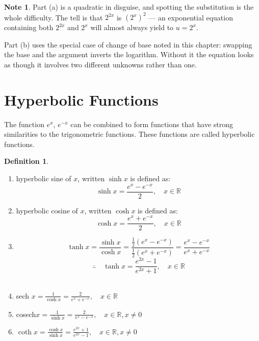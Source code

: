 \documentclass[11pt,a4paper]{article}
\theoremstyle{definition}
\newtheorem{definition}[thm]{Definition}
\newtheorem{note}[thm]{Note}
\begin{document}
\begin{note}
Part (a) is a quadratic in disguise, and spotting the substitution is the whole
difficulty. The tell is that $2^{2x}$ is $\left(2^{x}\right)^{2}$ --- an exponential
equation containing both $2^{2x}$ and $2^{x}$ will almost always yield to
$u=2^{x}$.

Part (b) uses the special case of change of base noted in this chapter: swapping
the base and the argument inverts the logarithm. Without it the equation looks as
though it involves two different unknowns rather than one.
\end{note}

\pagebreak
\section{Hyperbolic Functions}

The function $e^x$, $e^{-x}$ can be combined to form functions that have strong similarities to the trigonometric functions. These functions are called hyperbolic functions.\\

\begin{definition}

\begin{enumerate}
\item hyperbolic sine of $x$, written $\sinh x$ is defined as: $$\sinh x=\frac{e^{\displaystyle {x}}-e^{\displaystyle {-x}}}{2},\quad  x\in \mathbb{R}$$
\item hyperbolic cosine of $x$, written $\cosh x$ is defined as: $$\cosh x =\frac{e^{\displaystyle {x}}+e^{\displaystyle {-x}}}{2},\quad  x\in \mathbb{R}$$
\item $$\tanh x =\frac{\sinh x}{\cosh x}=\frac{\frac{1}{2}(e^{\displaystyle {x}}-e^{\displaystyle {-x}})}{\frac{1}{2}(e^{\displaystyle {x}}+e^{\displaystyle {-x}})}=\frac{e^{\displaystyle {x}}-e^{\displaystyle {-x}}}{e^{\displaystyle {x}}+e^{\displaystyle {-x}}}$$
$$\therefore \quad  \tanh x =\frac{e^{\displaystyle {2x}}-1}{e^{\displaystyle {2x}}+1}, \quad  x\in \mathbb{R}$$\\

\item sech $x=\frac{1}{\cosh x} =\frac{2}{\displaystyle{e^{\displaystyle{x}}+e^{\displaystyle{-x}}}},\quad  x\in \mathbb{R}$\\

\item cosech$x=\frac{1}{\sinh x}=\frac{2}{\displaystyle{e^{\displaystyle{x}}-e^{\displaystyle{-x}}}},\quad  x\in \mathbb{R}, x\neq 0$\\

\item $\coth x =\frac{\cosh x}{\sinh x}=\frac{\displaystyle{e^{\displaystyle{2x}}+1}}{\displaystyle{e^{\displaystyle{2x}}-1}},\quad  x\in \mathbb{R},x\neq 0$\\
\end{enumerate}
\end{definition}
\end{document}
